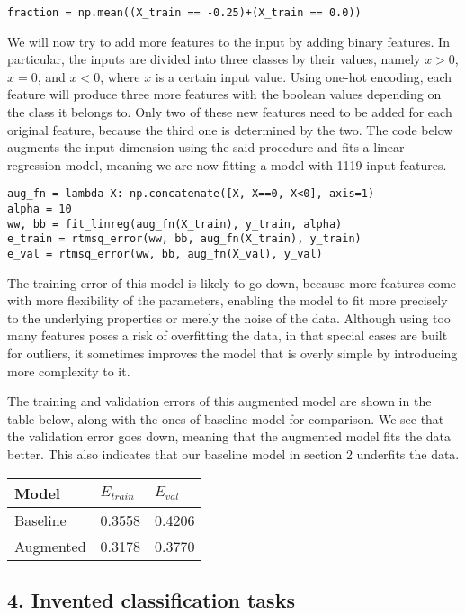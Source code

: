 \documentclass[11pt]{article}
\begin{document}
\begin{verbatim}
fraction = np.mean((X_train == -0.25)+(X_train == 0.0))
\end{verbatim}

We will now try to add more features to the input by adding binary
features. In particular, the inputs are divided into three classes by
their values, namely \(x>0\), \(x=0\), and \(x<0\), where \(x\) is a
certain input value. Using one-hot encoding, each feature will produce
three more features with the boolean values depending on the class it
belongs to. Only two of these new features need to be added for each
original feature, because the third one is determined by the two. The
code below augments the input dimension using the said procedure and
fits a linear regression model, meaning we are now fitting a model with
1119 input features.

\begin{verbatim}
aug_fn = lambda X: np.concatenate([X, X==0, X<0], axis=1)
alpha = 10
ww, bb = fit_linreg(aug_fn(X_train), y_train, alpha)
e_train = rtmsq_error(ww, bb, aug_fn(X_train), y_train)
e_val = rtmsq_error(ww, bb, aug_fn(X_val), y_val)
\end{verbatim}

The training error of this model is likely to go down, because more
features come with more flexibility of the parameters, enabling the
model to fit more precisely to the underlying properties or merely the
noise of the data. Although using too many features poses a risk of
overfitting the data, in that special cases are built for outliers, it
sometimes improves the model that is overly simple by introducing more
complexity to it.

The training and validation errors of this augmented model are shown in
the table below, along with the ones of baseline model for comparison.
We see that the validation error goes down, meaning that the augmented
model fits the data better. This also indicates that our baseline model
in section 2 underfits the data.

\begin{longtable}[]{@{}lll@{}}
\toprule
Model & \(E_{train}\) & \(E_{val}\)\tabularnewline
\midrule
\endhead
Baseline & 0.3558 & 0.4206\tabularnewline
Augmented & 0.3178 & 0.3770\tabularnewline
\bottomrule
\end{longtable}

\hypertarget{invented-classification-tasks}{%
\subsection{4. Invented classification
tasks}\label{invented-classification-tasks}}
\end{document}

